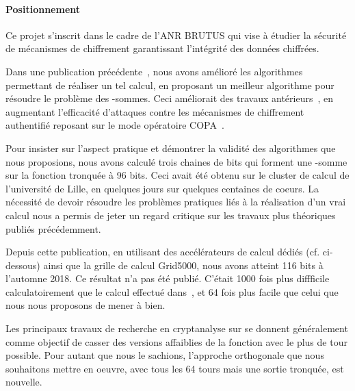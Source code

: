 \documentclass[
    a4paper, 
    12pt, onecolumn,
]{article}
\begin{document}

\paragraph{Positionnement}

Ce projet s'inscrit dans le cadre de l'ANR BRUTUS qui vise à étudier la sécurité
de mécanismes de chiffrement garantissant l'intégrité des données chiffrées.

Dans une publication précédente~\cite{BouillaguetDF18}, nous avons amélioré les
algorithmes permettant de réaliser un tel calcul, en proposant un meilleur
algorithme pour résoudre le problème des -sommes\fg{}. Ceci améliorait des
travaux antérieurs~\cite{NikolicSasaki2014}, en augmentant l'efficacité
d'attaques contre les mécanismes de chiffrement authentifié reposant sur le mode
opératoire COPA~\cite{COPA}.

Pour insister sur l'aspect pratique et démontrer la validité des algorithmes que
nous proposions, nous avons calculé trois chaines de bits qui forment une -somme\fg{} sur la fonction \sha tronquée à 96 bits. Ceci avait été obtenu sur
le cluster de calcul de l'université de Lille, en quelques jours sur quelques
centaines de coeurs. La nécessité de devoir résoudre les problèmes pratiques
liés à la réalisation d'un \og vrai\fg{} calcul nous a permis de jeter un regard
critique sur les travaux plus théoriques publiés précédemment.

Depuis cette publication, en utilisant des accélérateurs de calcul dédiés
(cf. ci-dessous) ainsi que la grille de calcul \textsf{Grid5000}, nous avons
atteint 116 bits à l'automne 2018. Ce résultat n'a pas été publié. C'était 1000
fois plus diffficile calculatoirement que le calcul effectué
dans~\cite{BouillaguetDF18}, et 64 fois plus facile que celui que nous nous
proposons de mener à bien.

Les principaux travaux de recherche en cryptanalyse sur \sha se donnent
généralement comme objectif de \og casser\fg{} des versions affaiblies de la
fonction avec le plus de tour possible. Pour autant que nous le sachions,
l'approche orthogonale que nous souhaitons mettre en oeuvre, avec tous les 64
tours mais une sortie tronquée, est nouvelle.
\end{document}
